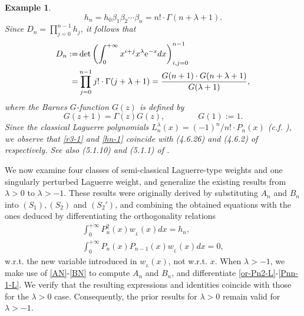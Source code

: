 \documentclass[12pt,a4paper]{article}    %
\newcommand{\e}{{\rm e}}
\newtheorem{exm}{Example}
\numberwithin{equation}{section}
\begin{document}
\begin{exm}
\begin{equation}
h_n=h_0\beta_1\beta_2\cdots\beta_n=n! \cdot \Gamma(n+\lambda+1).
\end{equation}
Since $D_n=\prod_{j=0}^{n-1}h_j$, it follows that
\begin{align*}
D_n:=&\det \left( \int_0^{+\infty}x^{i+j}x^{\lambda}\e^{-x}dx\right) _{i,j=0}^{n-1}\\
=&\prod_{j=0}^{n-1}j!\cdot \Gamma(j+\lambda+1)=\frac{G(n+1)\cdot G(n+\lambda+1)}{G(\lambda+1)},
\end{align*}
where the Barnes $G$-function $G(z)$ is defined by \cite[p.184]{Forrester}
\begin{equation*}
G(z+1)=\Gamma(z)G(z),\qquad\qquad G(1):=1.
\end{equation*}
Since the classical Laguerre polynomials $L_n^{\lambda}(x)=(-1)^n/n!\cdot P_n(x)$ (c.f. \cite[(4.6.3)]{Ismail}), we observe that \eqref{r3-1} and \eqref{hn-1} coincide with (4.6.26) and (4.6.2) of \cite{Ismail} respectively. See also (5.1.10) and (5.1.1) of \cite{Szego}.
\end{exm}

We now examine four classes of semi-classical Laguerre-type weights and one singularly perturbed Laguerre weight, and generalize the existing results from $\lambda>0$ to $\lambda>-1$.  These results were originally derived by substituting $A_n$ and $B_n$ into $(S_1), (S_2)$ and $(S_2')$, and combining the obtained equations with the ones deduced by differentiating the orthogonality relations
 \begin{gather}	 \int_{0}^{+\infty}P_n^2(x)w_{_L}(x)dx=h_n,\label{or-Pn2-L}\\
 \int_{0}^{+\infty}P_n(x)P_{n-1}(x)w_{_L}(x)dx=0,\label{Pnn-1-L}
\end{gather}
w.r.t. the new variable introduced in $w_{_L}(x)$, not w.r.t.  $x$. When $\lambda>-1$, we make use of \eqref{AN}-\eqref{BN} to compute $A_n$ and $B_n$, and differentiate \eqref{or-Pn2-L}-\eqref{Pnn-1-L}. We verify that the resulting expressions and identities coincide with those for the $\lambda>0$ case. Consequently, the prior results for $\lambda>0$ remain valid for $\lambda>-1$.
\end{document}
